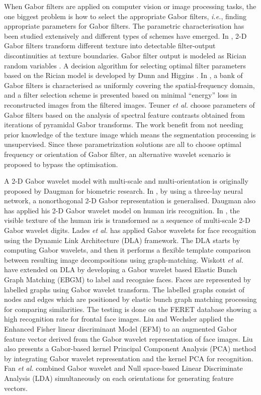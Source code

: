 When Gabor filters are applied on computer vision or image processing tasks, the one biggest problem is how to select the appropriate Gabor filters, \textit{i.e.}, finding appropriate parameters for Gabor filters. The parametric characterisation has been studied extensively and different types of schemes have emerged. In \cite{Dunn1994}, 2-D Gabor filters transform different texture into detectable filter-output discontinuities at texture boundaries. Gabor filter output is modeled as Rician random variables \cite{Dunn1994}. A decision algorithm for selecting optimal filter parameters based on the Rician model is developed by Dunn and Higgins \cite{Dunn1995}. In \cite{Jain1991}, a bank of Gabor filters is characterised as uniformly covering the spatial-frequency domain, and a filter selection scheme is presented based on minimal ``energy'' loss in reconstructed images from the filtered images. Teuner \textit{et al.} \cite{Teuner1995} choose parameters of Gabor filters based on the analysis of spectral feature contrasts obtained from iterations of pyramidal Gabor transforms. The work benefit from not needing prior knowledge of the texture image which means the segmentation processing is unsupervised. Since these parametrization solutions are all to choose optimal frequency or orientation of Gabor filter, an alternative wavelet scenario is proposed to bypass the optimisation. 

A 2-D Gabor wavelet model with multi-scale and multi-orientation is originally proposed by Daugman \cite{Daugman1985, Daugman1988} for biometric research. In \cite{Daugman1988}, by using a three-lay neural network, a nonorthogonal 2-D Gabor representation is generalised. Daugman also has applied his 2-D Gabor wavelet model on human iris recognition.  In \cite{Daugman1993}, the visible texture of the human iris is transformed as a sequence of multi-scale 2-D Gabor wavelet digits. Lades \textit{et al.} \cite{Lades1993} has applied Gabor wavelets for face recognition using the Dynamic Link Architecture (DLA) framework. The DLA starts by computing Gabor wavelets, and then it performs a flexible template comparison between resulting image decompositions using graph-matching. Wiskott \textit{et al.} \cite{Wiskott1997,Wiskott1999} have extended on DLA by developing a Gabor wavelet based Elastic Bunch Graph Matching (EBGM) to label and recognise faces. Faces are represented by labelled graphs using Gabor wavelet transform. The labelled graphs consist of nodes and edges which are positioned by elastic bunch graph matching processing for comparing similarities. The testing is done on the FERET database \cite{Phillips2000} showing a high recognition rate for frontal face images. Liu and Wechsler \cite{Liu2002} applied the Enhanced Fisher linear discriminant Model (EFM) to an augmented Gabor feature vector \cite{Liu2001} derived from the Gabor wavelet representation of face images. Liu \cite{Liu2004} also presents a Gabor-based kernel Principal Component Analysis (PCA) method by integrating Gabor wavelet representation and the kernel PCA for recognition.  Fan \textit{et al.} \cite{Fan2004} combined Gabor wavelet and Null space-based Linear Discriminate Analysis (LDA) simultaneously on each orientations for generating feature vectors.

